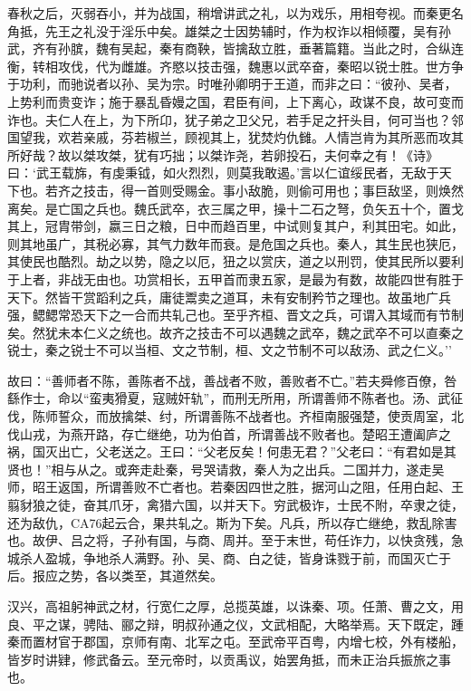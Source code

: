 \documentclass[]{article}
\begin{document}
春秋之后，灭弱吞小，并为战国，稍增讲武之礼，以为戏乐，用相夸视。而秦更名角抵，先王之礼没于淫乐中矣。雄桀之士因势辅时，作为权诈以相倾覆，吴有孙武，齐有孙膑，魏有吴起，秦有商鞅，皆擒敌立胜，垂著篇籍。当此之时，合纵连衡，转相攻伐，代为雌雄。齐愍以技击强，魏惠以武卒奋，秦昭以锐士胜。世方争于功利，而驰说者以孙、吴为宗。时唯孙卿明于王道，而非之曰：``彼孙、吴者，上势利而贵变诈；施于暴乱昏嫚之国，君臣有间，上下离心，政谋不良，故可变而诈也。夫仁人在上，为下所卬，犹子弟之卫父兄，若手足之扞头目，何可当也？邻国望我，欢若亲戚，芬若椒兰，顾视其上，犹焚灼仇雠。人情岂肯为其所恶而攻其所好哉？故以桀攻桀，犹有巧拙；以桀诈尧，若卵投石，夫何幸之有！《诗》曰：`武王载旆，有虔秉钺，如火烈烈，则莫我敢遏。'言以仁谊绥民者，无敌于天下也。若齐之技击，得一首则受赐金。事小敌脆，则偷可用也；事巨敌坚，则焕然离矣。是亡国之兵也。魏氏武卒，衣三属之甲，操十二石之弩，负矢五十个，置戈其上，冠胄带剑，嬴三日之粮，日中而趋百里，中试则复其户，利其田宅。如此，则其地虽广，其税必寡，其气力数年而衰。是危国之兵也。秦人，其生民也狭厄，其使民也酷烈。劫之以势，隐之以厄，狃之以赏庆，道之以刑罚，使其民所以要利于上者，非战无由也。功赏相长，五甲首而隶五家，是最为有数，故能四世有胜于天下。然皆干赏蹈利之兵，庸徒鬻卖之道耳，未有安制矜节之理也。故虽地广兵强，鳃鳃常恐天下之一合而共轧己也。至乎齐桓、晋文之兵，可谓入其域而有节制矣。然犹未本仁义之统也。故齐之技击不可以遇魏之武卒，魏之武卒不可以直秦之锐士，秦之锐士不可以当桓、文之节制，桓、文之节制不可以敌汤、武之仁义。''

故曰：``善师者不陈，善陈者不战，善战者不败，善败者不亡。''若夫舜修百僚，咎繇作士，命以``蛮夷猾夏，寇贼奸轨''，而刑无所用，所谓善师不陈者也。汤、武征伐，陈师誓众，而放擒桀、纣，所谓善陈不战者也。齐桓南服强楚，使贡周室，北伐山戎，为燕开路，存亡继绝，功为伯首，所谓善战不败者也。楚昭王遭阖庐之祸，国灭出亡，父老送之。王曰：``父老反矣！何患无君？''父老曰：``有君如是其贤也！''相与从之。或奔走赴秦，号哭请救，秦人为之出兵。二国并力，遂走吴师，昭王返国，所谓善败不亡者也。若秦因四世之胜，据河山之阻，任用白起、王翦豺狼之徒，奋其爪牙，禽猎六国，以并天下。穷武极诈，士民不附，卒隶之徒，还为敌仇，CA76起云合，果共轧之。斯为下矣。凡兵，所以存亡继绝，救乱除害也。故伊、吕之将，子孙有国，与商、周并。至于末世，苟任诈力，以快贪残，急城杀人盈城，争地杀人满野。孙、吴、商、白之徒，皆身诛戮于前，而国灭亡于后。报应之势，各以类至，其道然矣。

汉兴，高祖躬神武之材，行宽仁之厚，总揽英雄，以诛秦、项。任萧、曹之文，用良、平之谋，骋陆、郦之辩，明叔孙通之仪，文武相配，大略举焉。天下既定，踵秦而置材官于郡国，京师有南、北军之屯。至武帝平百粤，内增七校，外有楼船，皆岁时讲肄，修武备云。至元帝时，以贡禹议，始罢角抵，而未正治兵振旅之事也。
\end{document}

